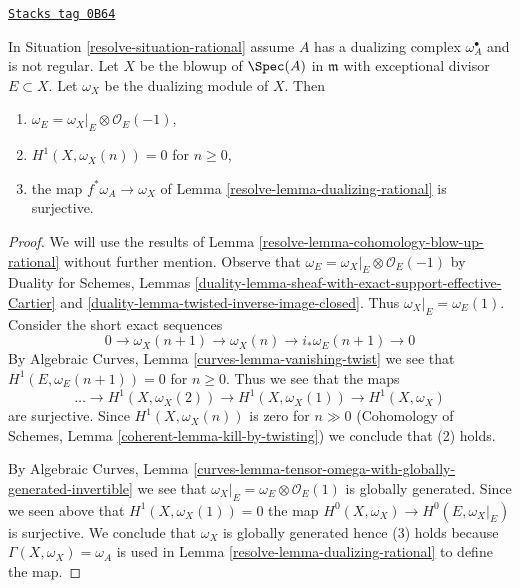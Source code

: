 \begin{lemma}
\label{resolve-lemma-dualizing-blow-up-rational}
\href{https://stacks.math.columbia.edu/tag/0B64}{\texttt{Stacks tag 0B64}}

In Situation \ref{resolve-situation-rational} assume $A$ has a
dualizing complex $\omega_A^\bullet$ and is not regular.
Let $X$ be the blowup of $\Spec(A)$ in $\mathfrak m$ with
exceptional divisor $E \subset X$. Let $\omega_X$
be the dualizing module of $X$. Then
\begin{enumerate}
\item $\omega_E = \omega_X|_E \otimes \mathcal{O}_E(-1)$,
\item $H^1(X, \omega_X(n)) = 0$ for $n \geq 0$,
\item the map $f^*\omega_A \to \omega_X$ of
Lemma \ref{resolve-lemma-dualizing-rational} is surjective.
\end{enumerate}
\end{lemma}

\begin{proof}

We will use the results of Lemma \ref{resolve-lemma-cohomology-blow-up-rational}
without further mention. Observe that
$\omega_E = \omega_X|_E \otimes \mathcal{O}_E(-1)$
by Duality for Schemes, Lemmas
\ref{duality-lemma-sheaf-with-exact-support-effective-Cartier} and
\ref{duality-lemma-twisted-inverse-image-closed}. Thus
$\omega_X|_E = \omega_E(1)$. Consider the short exact sequences
$$
0 \to \omega_X(n + 1) \to \omega_X(n) \to i_*\omega_E(n + 1) \to 0
$$
By Algebraic Curves, Lemma \ref{curves-lemma-vanishing-twist}
we see that $H^1(E, \omega_E(n + 1)) = 0$ for $n \geq 0$.
Thus we see that the maps
$$
\ldots \to H^1(X, \omega_X(2)) \to H^1(X, \omega_X(1)) \to H^1(X, \omega_X)
$$
are surjective. Since $H^1(X, \omega_X(n))$ is zero for $n \gg 0$
(Cohomology of Schemes, Lemma \ref{coherent-lemma-kill-by-twisting})
we conclude that (2) holds.

\medskip\noindent
By Algebraic Curves, Lemma
\ref{curves-lemma-tensor-omega-with-globally-generated-invertible}
we see that $\omega_X|_E = \omega_E \otimes \mathcal{O}_E(1)$
is globally generated. Since we seen above that
$H^1(X, \omega_X(1)) = 0$ the map $H^0(X, \omega_X) \to H^0(E, \omega_X|_E)$
is surjective. We conclude that $\omega_X$ is globally generated
hence (3) holds because $\Gamma(X, \omega_X) = \omega_A$ is used
in Lemma \ref{resolve-lemma-dualizing-rational} to define the map.
\end{proof}

